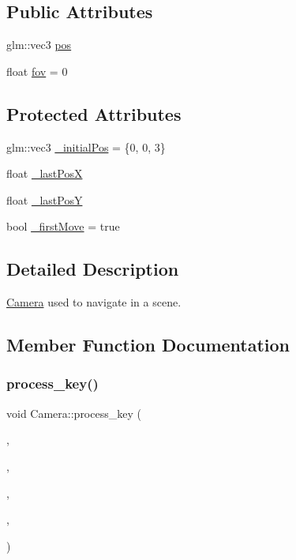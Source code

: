 \subsection*{Public Attributes}
\begin{DoxyCompactItemize}
\item 
glm\+::vec3 \hyperlink{classCamera_ae54915cea5c8741a9cc38b8f9b6849ff}{pos}
\item 
float \hyperlink{classCamera_aff7393c9cfbccd7e369091f00008da93}{fov} = 0
\end{DoxyCompactItemize}
\subsection*{Protected Attributes}
\begin{DoxyCompactItemize}
\item 
glm\+::vec3 \hyperlink{classCamera_a214af03f2a5040b630f8c24d0952c112}{\+\_\+initial\+Pos} = \{0, 0, 3\}
\item 
float \hyperlink{classCamera_a98641504c424fd46fd742287e8b4c518}{\+\_\+last\+PosX}
\item 
float \hyperlink{classCamera_a5488570163bcbaa8b5c4064d04969806}{\+\_\+last\+PosY}
\item 
bool \hyperlink{classCamera_a4b8929090b9d34548058e10f744f7156}{\+\_\+first\+Move} = true
\end{DoxyCompactItemize}


\subsection{Detailed Description}
\hyperlink{classCamera}{Camera} used to navigate in a scene. 

\subsection{Member Function Documentation}
\mbox{\label{classCamera_ac7fb896a59f9f456ab2041f9dca9b841}} 
\subsubsection{\texorpdfstring{process\+\_\+key()}{process\_key()}}
{\footnotesize\ttfamily void Camera\+::process\+\_\+key (\begin{DoxyParamCaption}\item[{G\+L\+F\+Wwindow $\ast$}]{,  }\item[{int}]{,  }\item[{int}]{,  }\item[{int}]{,  }\item[{int}]{ }\end{DoxyParamCaption})\hspace{0.3cm}{\ttfamily [virtual]}}



